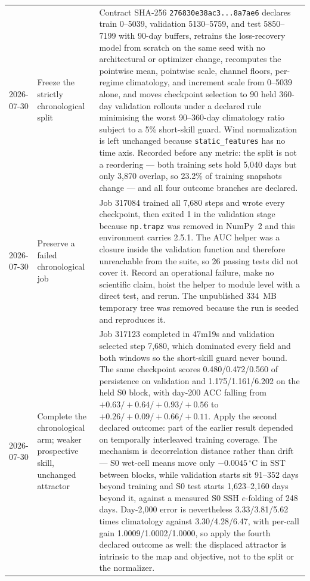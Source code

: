 \documentclass[11pt]{article}
\begin{document}
\begin{longtable}{@{}p{}p{}p{}@{}}
2026-07-30 & Freeze the strictly chronological split & Contract SHA-256 \texttt{276830e38ac3...8a7ae6} declares train 0--5039, validation 5130--5759, and test 5850--7199 with 90-day buffers, retrains the loss-recovery model from scratch on the same seed with no architectural or optimizer change, recomputes the pointwise mean, pointwise scale, channel floors, per-regime climatology, and increment scale from 0--5039 alone, and moves checkpoint selection to 90 held 360-day validation rollouts under a declared rule minimising the worst 90--360-day climatology ratio subject to a 5\% short-skill guard.  Wind normalization is left unchanged because \texttt{static\_features} has no time axis.  Recorded before any metric: the split is not a reordering --- both training sets hold 5,040 days but only 3,870 overlap, so 23.2\% of training snapshots change --- and all four outcome branches are declared. \\
2026-07-30 & Preserve a failed chronological job & Job 317084 trained all 7,680 steps and wrote every checkpoint, then exited 1 in the validation stage because \texttt{np.trapz} was removed in NumPy~2 and this environment carries 2.5.1.  The AUC helper was a closure inside the validation function and therefore unreachable from the suite, so 26 passing tests did not cover it.  Record an operational failure, make no scientific claim, hoist the helper to module level with a direct test, and rerun.  The unpublished 334~MB temporary tree was removed because the run is seeded and reproduces it. \\
2026-07-30 & Complete the chronological arm; weaker prospective skill, unchanged attractor & Job 317123 completed in 47m19s and validation selected step 7,680, which dominated every field and both windows so the short-skill guard never bound.  The same checkpoint scores 0.480/0.472/0.560 of persistence on validation and 1.175/1.161/6.202 on the held S0 block, with day-200 ACC falling from \(+0.63/+0.64/+0.93/+0.56\) to \(+0.26/+0.09/+0.66/+0.11\).  Apply the second declared outcome: part of the earlier result depended on temporally interleaved training coverage.  The mechanism is decorrelation distance rather than drift --- S0 wet-cell means move only \(-0.0045\,^\circ\mathrm{C}\) in SST between blocks, while validation starts sit 91--352 days beyond training and S0 test starts 1,623--2,160 days beyond it, against a measured S0 SSH \(e\)-folding of 248 days.  Day-2,000 error is nevertheless 3.33/3.81/5.62 times climatology against 3.30/4.28/6.47, with per-call gain 1.0009/1.0002/1.0000, so apply the fourth declared outcome as well: the displaced attractor is intrinsic to the map and objective, not to the split or the normalizer. \\

\end{longtable}
\end{document}
